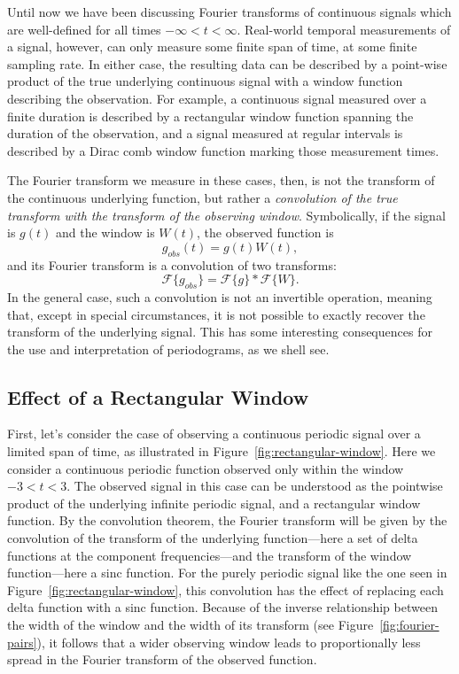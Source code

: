 \documentclass[preprint]{aastex}
\newcommand{\Fig}[1]{Figure~\ref{fig:#1}}
\newcommand{\fig}[1]{Figure~\ref{fig:#1}}
\begin{document}
Until now we have been discussing Fourier transforms of continuous signals
which are well-defined for all times $-\infty < t < \infty$.
Real-world temporal measurements of a signal, however, can only measure some
finite span of time, at some finite sampling rate.
In either case, the resulting data can be described by a point-wise product
of the true underlying continuous signal with a window function describing
the observation.
For example, a continuous signal measured over a finite duration is described
by a rectangular window function spanning the duration of the observation,
and a signal measured at regular intervals is described by a Dirac comb window
function marking those measurement times.

The Fourier transform we measure in these cases, then, is not the
transform of the continuous underlying function, but rather a 
{\it convolution of the true transform with the transform of the observing
window}.
Symbolically, if the signal is $g(t)$ and the window is $W(t)$, the observed
function is
\begin{equation}
  g_{obs}(t) = g(t)W(t),
\end{equation}
and its Fourier transform is a convolution of two transforms:
\begin{equation}
  \mathcal{F}\{g_{obs}\} = \mathcal{F}\{g\} \ast \mathcal{F}\{W\}.
\end{equation}
In the general case, such a convolution is not an invertible operation, meaning
that, except in special circumstances, it is not possible to exactly recover
the transform of the underlying signal.
This has some interesting consequences for the use and interpretation of
periodograms, as we shell see.

\subsection{Effect of a Rectangular Window}

First, let's consider the case of observing a continuous periodic signal over
a limited span of time, as illustrated in \Fig{rectangular-window}.
Here we consider a continuous periodic function observed only within the
window $-3<t<3$.
The observed signal in this case can be understood as the pointwise product of
the underlying infinite periodic signal, and a rectangular window function.
By the convolution theorem, the Fourier transform will be given by the
convolution of the transform of the underlying function---here a set of
delta functions at the component frequencies---and the transform of the window
function---here a sinc function.
For the purely periodic signal like the one seen in \fig{rectangular-window},
this convolution has the effect of replacing each delta function with a
sinc function.
Because of the inverse relationship between the width of the window and the
width of its transform (see \Fig{fourier-pairs}), it follows that a wider
observing window leads to proportionally less spread in the Fourier
transform of the observed function.
\end{document}
